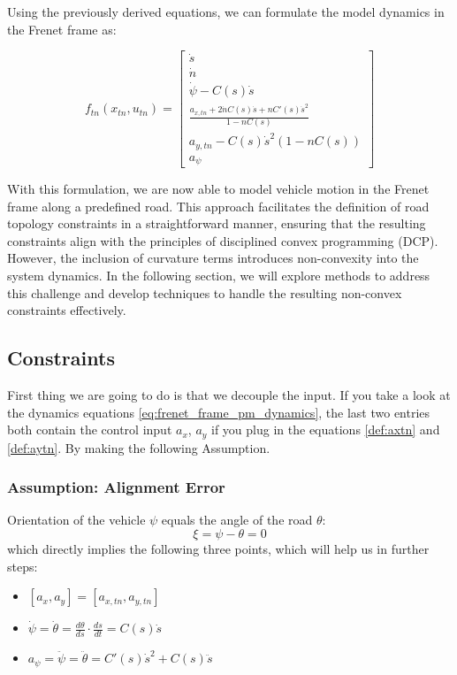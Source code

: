 Using the previously derived equations, we can formulate the model dynamics in the Frenet frame as:

\begin{equation}
	\label{eq:frenet_frame_pm_dynamics}
	f_{tn}(x_{tn}, u_{tn}) = \begin{bmatrix}
		\dot{s}                                   \\
		\dot{n}                                   \\
		\dot{\psi} - C(s)\dot{s}                  \\
		\frac{ a_{x,tn} + 2\dot{n}
		C(s)\dot{s}+nC'(s)\dot{s}^2 } { 1-nC(s) } \\ a_{y,tn} - C(s)\dot{s}^2(1-nC(s)) \\ a_\psi\end{bmatrix} \end{equation}

With this
formulation, we are now able to model vehicle motion in the Frenet frame along a predefined road.
This approach facilitates the definition of road topology constraints in a straightforward manner, ensuring that the resulting constraints align with
the principles of disciplined convex programming (DCP).
However, the inclusion of curvature terms introduces non-convexity into the system dynamics.
In the following section, we will explore methods to address this challenge and develop techniques to handle the resulting non-convex constraints
effectively.

\subsection{Constraints} \label{subsec:constraints}

First thing we are going to do is that we decouple the input.
If you take a look at the dynamics equations \ref{eq:frenet_frame_pm_dynamics}, the last two entries both contain the control input $a_x$, $a_y$ if
you plug in the equations \ref{def:axtn} and \ref{def:aytn}.
By making the following Assumption.

\subsubsection{Assumption: Alignment Error}

Orientation of the vehicle $\psi$ equals the angle of the road $\theta$:
\begin{equation}
	\xi = \psi - \theta = 0
\end{equation}
which directly implies the following three points, which will help us in further steps:
\begin{itemize}
	\item $[a_x, a_y] = [a_{x,tn}, a_{y,tn}]$
	\item $\dot{\psi} = \dot{\theta} = \frac{d\theta}{ds} \cdot \frac{ds}{dt} = C(s)\dot{s}$
	\item $a_\psi = \ddot{\psi} = \ddot{\theta} = C'(s) \dot{s}^2 + C(s)\ddot{s}$
\end{itemize}

